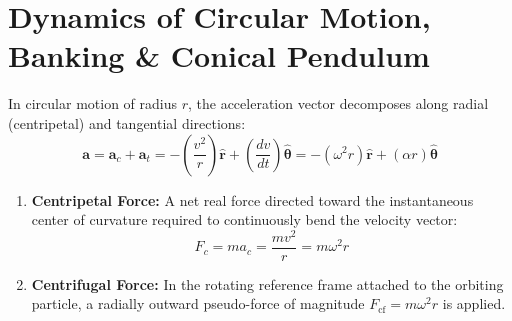\documentclass[10pt,twoside,openright]{book}
\begin{document}
\section{Dynamics of Circular Motion, Banking \& Conical Pendulum}

\begin{conceptbox}
In circular motion of radius $r$, the acceleration vector decomposes along radial (centripetal) and tangential directions:
\begin{equation}
  \mathbf{a} = \mathbf{a}_c + \mathbf{a}_t = -\left(\frac{v^2}{r}\right)\hat{\mathbf{r}} + \left(\frac{dv}{dt}\right)\hat{\boldsymbol{\theta}} = -(\omega^2 r)\hat{\mathbf{r}} + (\alpha r)\hat{\boldsymbol{\theta}}
\end{equation}
\begin{enumerate}[leftmargin=*]
  \item \textbf{Centripetal Force:} A net real force directed toward the instantaneous center of curvature required to continuously bend the velocity vector:
  \begin{equation}
    F_c = m a_c = \frac{m v^2}{r} = m \omega^2 r
  \end{equation}
  \item \textbf{Centrifugal Force:} In the rotating reference frame attached to the orbiting particle, a radially outward pseudo-force of magnitude $F_{\text{cf}} = m\omega^2 r$ is applied.
\end{enumerate}
\end{conceptbox}
\end{document}
